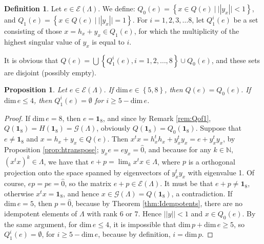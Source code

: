 \documentclass[12pt]{article}
\theoremstyle{plain}
\newtheorem{proposition}{Proposition}
\theoremstyle{definition}
\newtheorem{definition}{Definition}
\theoremstyle{remark}
\numberwithin{equation}{section}
\begin{document}
\begin{definition}
    Let $e \in \mathcal{E}(\Lambda)$.
    We define:
    $Q_{0}(e) = \left \{ x \in Q(e) \: | \: || y_{x} || < 1 \right \}$, and
    $Q_{1}(e) = \left \{ x \in Q(e) \: | \: || y_{x} || = 1 \right \}$.
    For $i = 1, 2, 3, \ldots 8$,
    let $Q_{1}^{i}(e)$ be a set consisting of those $x = h_{x} + y_{x} \in Q_{1}(e)$,
    for which the multiplicity of the highest singular value of $y_{x}$
    is equal to $i$.
\end{definition}

It is obvious that
$Q(e) = \bigcup \left \{ Q_{1}^{i}(e), i=1,2,\ldots,8 \right \} \cup Q_{0}(e)$,
and these sets are disjoint (possibly empty).

\begin{proposition}
Let $e \in \mathcal{E}(\Lambda)$.
If $\mathrm{dim} \, e \in \left \{ 5,8 \right \}$,
then
$Q(e) = Q_{0}(e)$.
If $\mathrm{dim} \, e \leq 4$,
then
$Q_{1}^{i}(e) = \emptyset$ for $i \geq 5 - \mathrm{dim} \, e$.
\end{proposition}
\begin{proof}
    If $\mathrm{dim} \, e = 8$,
    then $e = \mathbf{1}_{8}$, and since by Remark \ref{rem:Qof1},
    $Q(\mathbf{1}_{8}) = H(\mathbf{1}_{8}) = \mathcal{G}(\Lambda)$,
    obviously $Q(\mathbf{1}_{8}) = Q_{0}(\mathbf{1}_{8})$.
    Suppose that $e \neq \mathbf{1}_{8}$
    and $x = h_{x} + y_{x} \in Q(e)$.
    Then $x^{t} x = h_{x}^{t} h_{x} + y_{x}^{t} y_{x} = e + y_{x}^{t} y_{x}$,
    by Proposition \ref{prop:htranspose};
    $y_{x} e = e y_{x} = \hat{0}$, 
    and because for any $k \in \mathbb{N}$, $(x^{t} x)^{k} \in \Lambda$,
    we have that $e + p = \lim_{k} x^{t} x \in \Lambda$,
    where $p$ is a orthogonal projection onto the space spanned by
    eigenvectors of $y_{x}^{t} y_{x}$ with eigenvalue 1.
    Of course, $e p = p e = \hat{0}$, so
    the matrix $e + p \in \mathcal{E}(\Lambda)$.
    It must be that $e + p \neq \mathbf{1}_{8}$,
    otherwise $x^{t} x = \mathbf{1}_{8}$, and hence
    $x \in \mathcal{G}(\Lambda) = Q(\mathbf{1}_{8})$, a contradiction.
    If $\mathrm{dim}\,e = 5$, then $p = \hat{0}$,
    because by Theorem \ref{thm:Idempotents},
    there are no idempotent elements of $\Lambda$
    with rank $6$ or $7$.
    Hence $||y|| < 1$ and $x \in Q_{0}(e)$.
    By the same argument, for $\textrm{dim}\, e \leq 4$,
    it is impossible that $\mathrm{dim} \, p  + \mathrm{dim}\, e \geq 5$,
    so $Q_{1}^{i}(e) = \emptyset$, for $i \geq 5 - \mathrm{dim} \, e$,
    because by definition, $i = \textrm{dim}\,p$.        
\end{proof}
\end{document}
